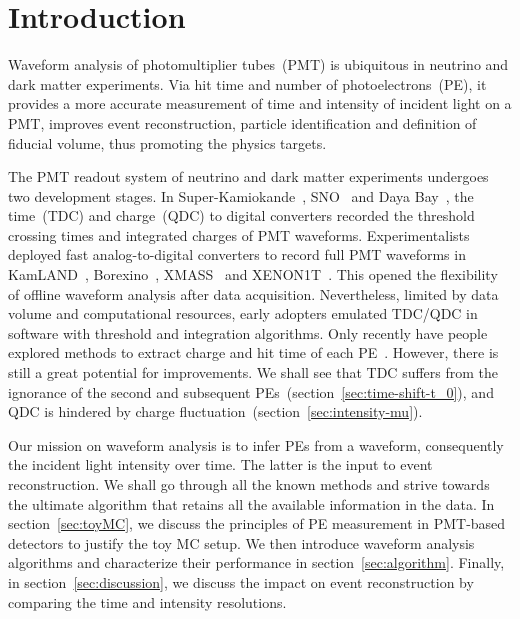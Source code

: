 \section{Introduction}
\label{sec:introduction}

Waveform analysis of photomultiplier tubes~(PMT) is ubiquitous in neutrino and dark matter experiments.  Via hit time and number of photoelectrons~(PE), it provides a more accurate measurement of time and intensity of incident light on a PMT, improves event reconstruction, particle identification and definition of fiducial volume, thus promoting the physics targets.

The PMT readout system of neutrino and dark matter experiments undergoes two development stages. In Super-Kamiokande~\cite{noauthor_super-kamiokande_2003}, SNO~\cite{dunger_event_2019} and Daya Bay~\cite{daya_bay_collaboration_measurement_2017}, the time~(TDC) and charge~(QDC) to digital converters recorded the threshold crossing times and integrated charges of PMT waveforms.  Experimentalists deployed fast analog-to-digital converters to record full PMT waveforms in KamLAND~\cite{kamland_collaboration_production_2010}, Borexino~\cite{alimonti_borexino_2009}, XMASS~\cite{abe_xmass_2013} and XENON1T~\cite{xenon_collaboration_xenon1t_2019}.  This opened the flexibility of offline waveform analysis after data acquisition.  Nevertheless, limited by data volume and computational resources, early adopters emulated TDC/QDC in software with threshold and integration algorithms.  Only recently have people explored methods to extract charge and hit time of each PE~\cite{zhang_comparison_2019}.  However, there is still a great potential for improvements.  We shall see that TDC suffers from the ignorance of the second and subsequent PEs~(section~\ref{sec:time-shift-t_0}), and QDC is hindered by charge fluctuation~(section~\ref{sec:intensity-mu}).

Our mission on waveform analysis is to infer PEs from a waveform, consequently the incident light intensity over time.  The latter is the input to event reconstruction.  We shall go through all the known methods and strive towards the ultimate algorithm that retains all the available information in the data.  In section~\ref{sec:toyMC}, we discuss the principles of PE measurement in PMT-based detectors to justify the toy MC setup.  We then introduce waveform analysis algorithms and characterize their performance in section~\ref{sec:algorithm}.  Finally, in section~\ref{sec:discussion}, we discuss the impact on event reconstruction by comparing the time and intensity resolutions.

